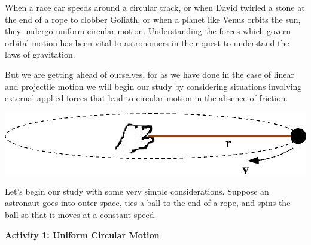 When a race car speeds around a circular track, or when David twirled a stone
at the end of a rope to clobber Goliath, or when a planet like Venus orbits
the sun, they undergo uniform circular motion. Understanding the forces which
govern orbital motion has been vital to astronomers in their quest to understand
the laws of gravitation. 

But we are getting ahead of ourselves, for as we have done in the case of linear
and projectile motion we will begin our study by considering situations involving
external applied forces that lead to circular motion in the absence of friction.

\vspace{0.3cm}
{\par\centering \includegraphics{centripetalForceFor132/centripetal_fig2b.eps} \par}
\vspace{0.3cm}

Let's begin our study with some very simple considerations. Suppose an astronaut
goes into outer space, ties a ball to the end of a rope, and spins the ball
so that it moves at a constant speed.

\textbf{Activity 1: Uniform Circular Motion }

